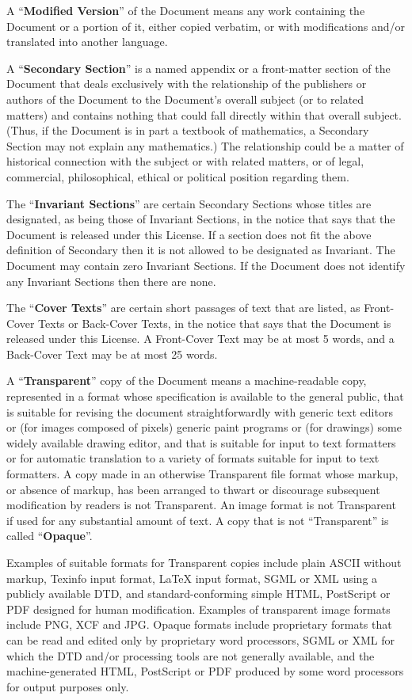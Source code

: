 A ``\textbf{Modified Version}'' of the Document means any work containing the
Document or a portion of it, either copied verbatim, or with
modifications and/or translated into another language.

A ``\textbf{Secondary Section}'' is a named appendix or a front-matter section of
the Document that deals exclusively with the relationship of the
publishers or authors of the Document to the Document's overall subject
(or to related matters) and contains nothing that could fall directly
within that overall subject.  (Thus, if the Document is in part a
textbook of mathematics, a Secondary Section may not explain any
mathematics.)  The relationship could be a matter of historical
connection with the subject or with related matters, or of legal,
commercial, philosophical, ethical or political position regarding
them.

The ``\textbf{Invariant Sections}'' are certain Secondary Sections whose titles
are designated, as being those of Invariant Sections, in the notice
that says that the Document is released under this License.  If a
section does not fit the above definition of Secondary then it is not
allowed to be designated as Invariant.  The Document may contain zero
Invariant Sections.  If the Document does not identify any Invariant
Sections then there are none.

The ``\textbf{Cover Texts}'' are certain short passages of text that are listed,
as Front-Cover Texts or Back-Cover Texts, in the notice that says that
the Document is released under this License.  A Front-Cover Text may
be at most 5 words, and a Back-Cover Text may be at most 25 words.

A ``\textbf{Transparent}'' copy of the Document means a machine-readable copy,
represented in a format whose specification is available to the
general public, that is suitable for revising the document
straightforwardly with generic text editors or (for images composed of
pixels) generic paint programs or (for drawings) some widely available
drawing editor, and that is suitable for input to text formatters or
for automatic translation to a variety of formats suitable for input
to text formatters.  A copy made in an otherwise Transparent file
format whose markup, or absence of markup, has been arranged to thwart
or discourage subsequent modification by readers is not Transparent.
An image format is not Transparent if used for any substantial amount
of text.  A copy that is not ``Transparent'' is called ``\textbf{Opaque}''.

Examples of suitable formats for Transparent copies include plain
ASCII without markup, Texinfo input format, LaTeX input format, SGML
or XML using a publicly available DTD, and standard-conforming simple
HTML, PostScript or PDF designed for human modification.  Examples of
transparent image formats include PNG, XCF and JPG.  Opaque formats
include proprietary formats that can be read and edited only by
proprietary word processors, SGML or XML for which the DTD and/or
processing tools are not generally available, and the
machine-generated HTML, PostScript or PDF produced by some word
processors for output purposes only.

